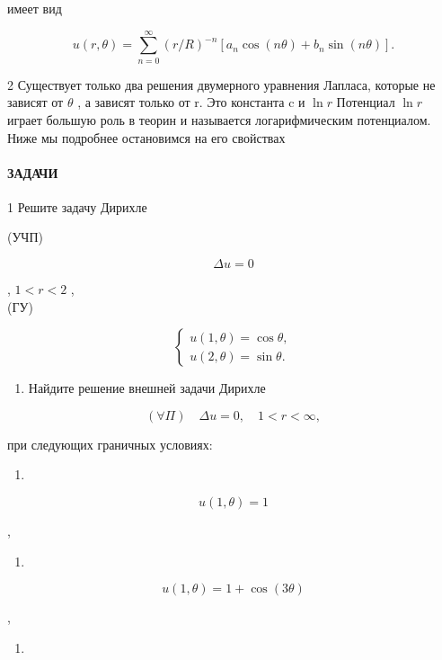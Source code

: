 \documentclass[
  ukrainian,
]{article}
\providecommand{\tightlist}{%
  \setlength{\itemsep}{0pt}\setlength{\parskip}{0pt}}
\begin{document}
имеет вид

\[
u(r, \theta) = \sum_{n=0}^{\infty} (r/R)^{-n} [a_n \cos(n\theta) + b_n \sin(n\theta)].
\]

2 Существует только два решения двумерного уравнения Лапласа, которые не
зависят от \(\theta\) , а зависят только от r. Это константа c и
\(\ln r\) Потенциал \(\ln r\) играет большую роль в теорин и называется
логарифмическим потенциалом. Ниже мы подробнее остановимся на его
свойствах

\paragraph{ЗАДАЧИ}\label{ux437ux430ux434ux430ux447ux438-9}

1 Решите задачу Дирихле

(УЧП)

\[
\Delta u = 0
\]

, \(1 < r < 2\) ,\\
(ГУ)

\[
\begin{cases} u(1, \theta) = \cos \theta, \\ u(2, \theta) = \sin \theta. \end{cases}
\]

\begin{enumerate}
\def\labelenumi{\arabic{enumi}.}
\setcounter{enumi}{1}
\tightlist
\item
  Найдите решение внешней задачи Дирихле
\end{enumerate}

\[
(\forall \Pi) \quad \Delta u = 0, \quad 1 < r < \infty,
\]

при следующих граничных условиях:

\begin{enumerate}
\def\labelenumi{\alph{enumi})}
\tightlist
\item
\end{enumerate}

\[
u(1, \theta) = 1
\]

,

\begin{enumerate}
\def\labelenumi{\arabic{enumi})}
\setcounter{enumi}{5}
\tightlist
\item
\end{enumerate}

\[
u(1, \theta) = 1 + \cos(3\theta)
\]

,

\begin{enumerate}
\def\labelenumi{\Alph{enumi})}
\setcounter{enumi}{1}
\tightlist
\item
\end{enumerate}
\end{document}
